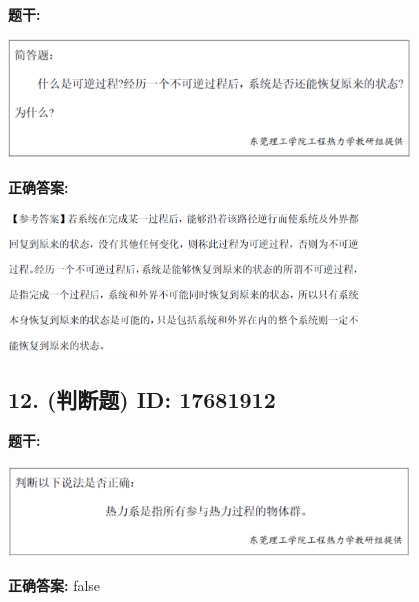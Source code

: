 \documentclass[12pt]{article}
\begin{document}
\textbf{题干:}


\begin{center}\includegraphics[width=0.8\textwidth, height=0.25\textheight, keepaspectratio]{question_11_17681925/title_img_1.png}\end{center}

\textbf{正确答案:}

\begin{center}\includegraphics[width=0.7\textwidth, height=0.2\textheight, keepaspectratio]{question_11_17681925/correct_answer_1_img_1.png}\end{center}

\vspace{0.5em}\hrulefill\vspace{1em}

\subsection*{12. (判断题) \small ID: 17681912}

\textbf{题干:}


\begin{center}\includegraphics[width=0.8\textwidth, height=0.25\textheight, keepaspectratio]{question_12_17681912/title_img_1.png}\end{center}

\textbf{正确答案:}
false

\vspace{0.5em}\hrulefill\vspace{1em}
\end{document}
